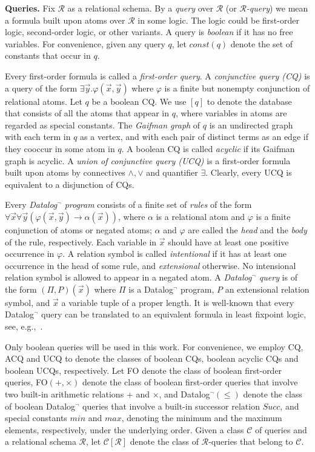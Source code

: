 \documentclass[letterpaper]{article} %
\theoremstyle{definition}
\theoremstyle{remark}
\theoremstyle{definition}
\begin{document}
\medskip
{\noindent\bf Queries.} Fix $\mathscr{R}$ as a relational schema. By a {\em query} over $\mathscr{R}$ (or {\em$\mathscr{R}$-query}) we mean a formula built upon atoms over $\mathscr{R}$ in some logic. The logic could be first-order logic, second-order logic, or other variants. A query is {\em boolean} if it has no free variables. For convenience, given any query $q$, let $const(q)$ denote the set of constants that occur in $q$.

Every first-order formula is called a {\em first-order query}. A {\em conjunctive query (CQ)} is a query of the form $\exists\vec{y}.\varphi(\vec{x},\vec{y})$ where $\varphi$ is a finite but nonempty conjunction of relational atoms. Let $q$ be a boolean CQ. We use $[q]$ to denote the database that consists of all the atoms that appear in $q$, where variables in atoms are regarded as special constants. The {\em Gaifman graph} of ${q}$ is an undirected graph with each term in ${q}$ as a vertex, and with each pair of distinct terms as an edge if they cooccur in some atom in ${q}$. A boolean CQ is called {\em acyclic} if its Gaifman graph is acyclic. A {\em union of conjunctive query (UCQ)} is a first-order formula built upon atoms by connectives $\wedge,\vee$ and quantifier $\exists$. Clearly, every UCQ is equivalent to a disjunction of CQs.

Every {\em Datalog$^\neg$ program} consists of a finite set of {\em rules} of the form $\forall\vec{x}\forall\vec{y}(\varphi(\vec{x},\vec{y})\rightarrow\alpha(\vec{x}))$, where $\alpha$ is a relational atom and $\varphi$ is a finite conjunction of atoms or negated atoms; $\alpha$ and $\varphi$ are called the {\em head} and the {\em body} of the rule, respectively. Each variable in $\vec{x}$ should have at least one positive occurrence in $\varphi$. A relation symbol is called {\em intentional} if it has at least one occurrence in the head of some rule, and {\em extensional} otherwise. No intensional relation symbol is allowed to appear in a negated atom. A {\em Datalog$^\neg$ query} is of the form $(\Pi,\textit{P})(\vec{x})$ where $\Pi$ is a Datalog$^\neg$ program, $\textit{P}$ an extensional relation symbol, and $\vec{x}$ a variable tuple of a proper length. It is well-known that every Datalog$^\neg$ query can be translated to an equivalent formula in least fixpoint logic, see, e.g.,~\cite{EbbinghuasF95}.

Only boolean queries will be used in this work.
For convenience, we employ {CQ}, {ACQ} and {UCQ} to denote the classes of boolean CQs, boolean acyclic CQs and boolean UCQs, respectively. Let {FO} denote the class of boolean first-order queries,  {FO}$(+,\times)$ denote the class of boolean first-order queries that involve two built-in arithmetic relations $+$ and $\times$, and {Datalog}$^\neg(\le)$ denote the class of boolean Datalog$^\neg$ queries that involve a built-in successor relation $\textit{Succ}$, and special constants $\textit{min}$ and $\textit{max}$, denoting the minimum and the maximum elements, respectively, under the underlying order. Given a class $\mathcal{C}$ of queries and a relational schema $\mathscr{R}$, let $\mathcal{C}[\mathscr{R}]$ denote the class of $\mathscr{R}$-queries that belong to $\mathcal{C}$. 
\end{document}
